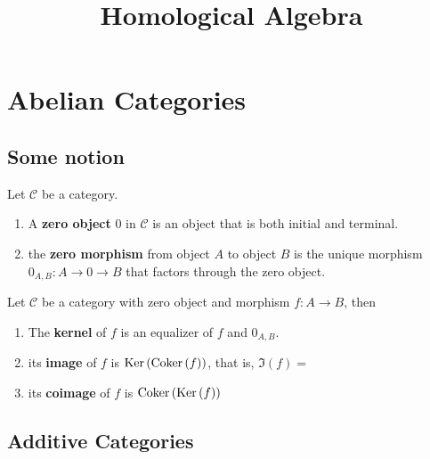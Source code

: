 \documentclass[12pt, oneside]{book}
\begin{document}
\frontmatter
\title{{\Huge{\textbf{Homological Algebra}}}}
\maketitle
{}
\tableofcontents %


\mainmatter
{} %


\chapter{Abelian Categories}

\section{Some notion}
\begin{definition}
    Let $\mathcal{C}$ be a category.
    \begin{enumerate}
        \item
              A \textbf{zero object} $0$ in $\mathcal{C}$ is an object that is both initial and terminal.
        \item
              the \textbf{zero morphism} from object $A$ to object $B$ is the unique morphism $0_{A,B}: A \rightarrow 0 \rightarrow B$ that factors through the zero object.
    \end{enumerate}
\end{definition}








\begin{definition}
    Let $\mathcal{C}$ be a category with zero object and morphism $f: A \rightarrow B$, then
    \begin{enumerate}
        \item
              The \textbf{kernel} of $f$ is an equalizer of $f$ and $0_{A,B}$.

        \item
              its \textbf{image} of $f$ is $\operatorname{\operatorname{Ker}}\left( \operatorname{\operatorname{Coker}}\left( f \right) \right)$, that is,
              $\Im\left( f \right)=   $
        \item
              its \textbf{coimage} of $f$ is $\operatorname{\operatorname{Coker}}\left( \operatorname{\operatorname{Ker}}\left( f \right) \right)$
    \end{enumerate}

\end{definition}

\section{Additive Categories}
\end{document}
